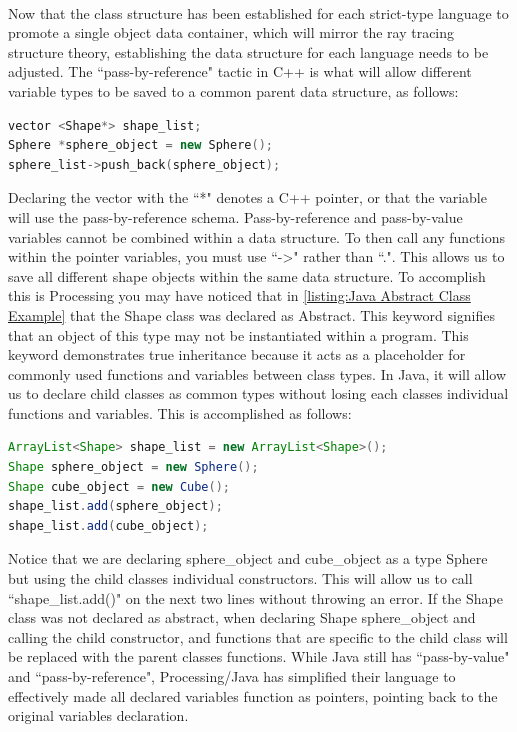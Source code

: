 \paragraph{} Now that the class structure has been established for each strict-type language to promote a single object data container, which will mirror the ray tracing structure theory, establishing the data structure for each language needs to be adjusted.  The ``pass-by-reference" tactic in C++ is what will allow different variable types to be saved to a common parent data structure, as follows:
\begin{lstlisting}[language=C++, caption=C++ Vector Example, style=mystyle]
vector <Shape*> shape_list;
Sphere *sphere_object = new Sphere();
sphere_list->push_back(sphere_object);
\end{lstlisting}
Declaring the vector with the ``*" denotes a C++ pointer, or that the variable will use the pass-by-reference schema.  Pass-by-reference and pass-by-value variables cannot be combined within a data structure.  To then call any functions within the pointer variables, you must use ``->" rather than ``.".  This allows us to save all different shape objects within the same data structure.  To accomplish this is Processing you may have noticed that in \ref{listing:Java Abstract Class Example} that the Shape class was declared as Abstract.  This keyword signifies that an object of this type may not be instantiated within a program.  This keyword demonstrates true inheritance because it acts as a placeholder for commonly used functions and variables between class types.  In Java, it will allow us to declare child classes as common types without losing each classes individual functions and variables. This is accomplished as follows:
\begin{lstlisting}[language=Java, caption=Java ArrayList Example, style=mystyle]
ArrayList<Shape> shape_list = new ArrayList<Shape>();
Shape sphere_object = new Sphere();
Shape cube_object = new Cube();
shape_list.add(sphere_object);
shape_list.add(cube_object);
\end{lstlisting}
\doublespacing
Notice that we are declaring sphere\_object and cube\_object as a type Sphere but using the child classes individual constructors.  This will allow us to call ``shape\_list.add()" on the next two lines without throwing an error.  If the Shape class was not declared as abstract, when declaring Shape sphere\_object and calling the child constructor, and functions that are specific to the child class will be replaced with the parent classes functions.  While Java still has ``pass-by-value" and ``pass-by-reference", Processing/Java has simplified their language to effectively made all declared variables function as pointers, pointing back to the original variables declaration.

